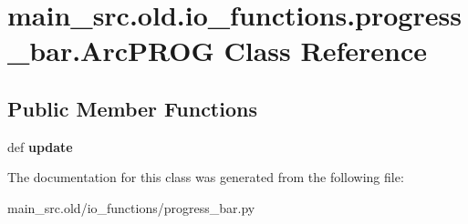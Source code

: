 \hypertarget{classmain__src_8old_1_1io__functions_1_1progress__bar_1_1ArcPROG}{\section{main\-\_\-src.\-old.\-io\-\_\-functions.\-progress\-\_\-bar.\-Arc\-P\-R\-O\-G Class Reference}
\label{classmain__src_8old_1_1io__functions_1_1progress__bar_1_1ArcPROG}
}
\subsection*{Public Member Functions}
\begin{DoxyCompactItemize}
\item 
\hypertarget{classmain__src_8old_1_1io__functions_1_1progress__bar_1_1ArcPROG_a8b8001aac5025ad5af28f560a65cad16}{def {\bfseries update}}\label{classmain__src_8old_1_1io__functions_1_1progress__bar_1_1ArcPROG_a8b8001aac5025ad5af28f560a65cad16}

\end{DoxyCompactItemize}


The documentation for this class was generated from the following file\-:\begin{DoxyCompactItemize}
\item 
main\-\_\-src.\-old/io\-\_\-functions/progress\-\_\-bar.\-py\end{DoxyCompactItemize}
